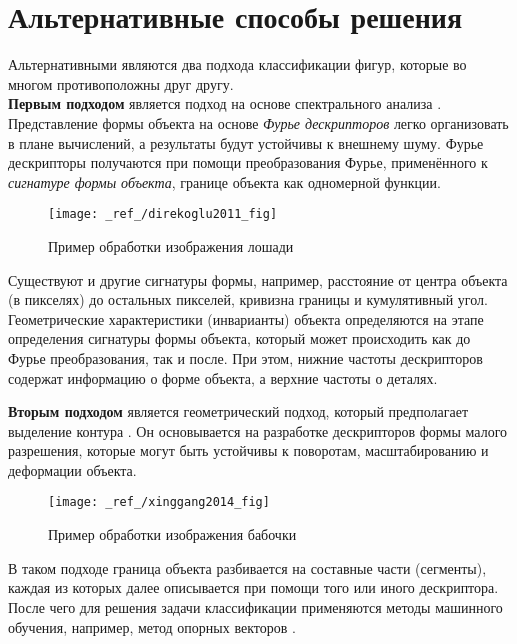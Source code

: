 \documentclass[12pt,a4paper]{article}
\begin{document}
\newpage
\section{Альтернативные способы решения}
Альтернативными являются два подхода классификации фигур, которые во многом противоположны друг другу.\\
\noindent
\textbf{Первым подходом} является подход на основе спектрального анализа \cite{direkoglu2011}. 
Представление формы объекта на основе \emph{Фурье дескрипторов} легко организовать в плане вычислений,
а результаты будут устойчивы к внешнему шуму. Фурье дескрипторы получаются при помощи преобразования
Фурье, применённого к \emph{сигнатуре формы объекта}, границе объекта как одномерной функции.


\begin{figure}[tbh!]
	\center
	\texttt{[image: \_ref\_/direkoglu2011\_fig]}
	\caption{Пример обработки изображения лошади \cite{direkoglu2011}}
\end{figure}
Существуют и другие сигнатуры формы, например, расстояние от центра объекта (в пикселях) до остальных пикселей,
кривизна границы и кумулятивный угол. Геометрические характеристики (инварианты) объекта
определяются на этапе определения сигнатуры формы объекта, который может происходить как до
Фурье преобразования, так и после. При этом, нижние частоты дескрипторов содержат
информацию о форме объекта, а верхние частоты о деталях.

\noindent
\textbf{Вторым подходом} является геометрический подход, который предполагает выделение контура \cite{wang2014}. 
Он основывается на разработке дескрипторов формы малого разрешения, которые могут быть
устойчивы к поворотам, масштабированию и деформации объекта.

\begin{figure}[H]
	\center
	\texttt{[image: \_ref\_/xinggang2014\_fig]}
	\caption{Пример обработки изображения бабочки \cite{wang2014}}
\end{figure}

В таком подходе граница объекта разбивается на составные части (сегменты), каждая
из которых далее описывается при помощи того или иного дескриптора. После чего
для решения задачи классификации применяются методы машинного обучения, например,
метод опорных векторов \cite{svm}.
\end{document}

